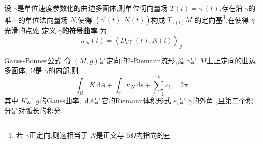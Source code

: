 \documentclass[../../几何与拓扑.tex]{subfiles}
\begin{document}
\begin{definition}
    设 \(   \gamma   \)是单位速度参数化的曲边多面体,则单位切向量场 \(  T\left( t \right)=  \gamma ^{\prime} \left( t \right)    \).存在沿 \(   \gamma   \)的唯一的单位法向量场 \(  N  \),使得 \(  \left(  \gamma ^{\prime} \left( t \right),N\left( t \right)   \right)   \)构成 \(  T_{ \gamma \left( t \right) }M  \)      的定向基\footnote{若 \(   \gamma   \)正定向,则这相当于 \(  N  \)是正交与 \(   \partial  \Omega   \)内指向的   }.在使得 \(   \gamma   \)光滑的点处 定义 \textbf{\(   \gamma   \)的符号曲率 }为 \[
     \kappa _{N}\left( t \right)= \left<D_{t} \gamma ^{\prime} \left( t \right),N\left( t \right)   \right>_{g} 
    \] 
\end{definition}

\begin{theorem}{Gauss-Bonnet公式}
    令 \(  \left( M,g \right)   \)是定向的2-Riemann流形,设 \(   \gamma   \)是 \(  M  \)上正定向的曲边多面体, \(   \Omega   \)是 \(   \gamma   \)的内部,则 \[
    \int_{ \Omega }K\,\mathrm{d} A+  \int_{ \gamma } \kappa _{N}\,\mathrm{d} s+ \sum _{i= 1}^{k} \varepsilon _{i}= 2\pi 
    \]     其中 \(  K  \)是 \(  g  \)的Gauss曲率, \(  \,\mathrm{d} A  \)是它的Riemann体积形式 \(   \varepsilon _{i}  \)是 \(   \gamma   \)的外角  ,且第二个积分是对弧长的积分.   
\end{theorem}
\end{document}

